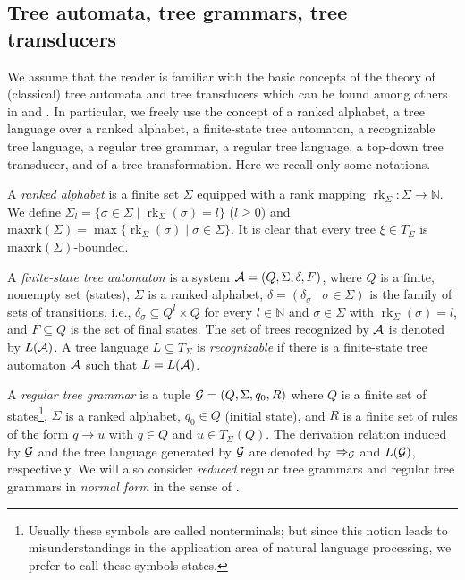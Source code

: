 \documentclass[10pt]{scrartcl}
\newcommand{\nat}{\mathbb{N}}
\newcommand{\maxrk}{{\mathrm{maxrk}}}
\newcommand{\A}{{\cal A}}
\newcommand{\G}{{\cal G}}
\DeclareMathOperator{\rk}{rk}
\begin{document}
\subsection{Tree automata, tree grammars, tree transducers}

We assume that the reader is familiar with the basic concepts of the theory of (classical) tree automata and tree transducers which can be found among others in \cite{gecste84,gecste97} and \cite{comdaugiljaclugtistom97}. In particular, we freely use the concept of a ranked alphabet, a tree language over a ranked alphabet, a finite-state tree automaton, a recognizable tree language, a regular tree grammar, a regular tree language, a top-down tree transducer, and of a tree transformation. Here we recall only some notations.

A {\em ranked alphabet} is a finite set $\Sigma$ equipped with a rank mapping $\rk_\Sigma: \Sigma \to \nat$. We define $\Sigma_l =\{ \sigma \in \Sigma \mid \rk_\Sigma(\sigma)=l \}$ ($l\ge 0$) and $\maxrk(\Sigma)=\max\{\rk_\Sigma(\sigma) \mid \sigma \in \Sigma \}$. 
It is clear that every tree $\xi \in T_\Sigma$ is $\maxrk(\Sigma)$-bounded.

A \emph{finite-state tree automaton} is a system $\A = (Q,\Sigma,\delta,F)$, where $Q$ is a finite, nonempty  set (states), $\Sigma$  is a ranked alphabet,  $\delta = (\delta_\sigma \mid \sigma \in \Sigma)$ is the family of sets of transitions, i.e., $\delta_\sigma \subseteq Q^l \times Q$ for every $l \in \nat$ and $\sigma \in \Sigma$ with $\rk_\Sigma(\sigma) =l$, and $F \subseteq Q$ is the set of final states. The set of trees recognized by $\A$ is denoted by $L(\A)$.
A tree language $L \subseteq T_\Sigma$ is {\em recognizable} if there is a finite-state tree automaton ${\cal A}$ such that $L = L({\cal A})$.


A \emph{regular tree grammar} is a tuple $\G = (Q,\Sigma,q_0,R)$ where $Q$ is a finite set of states\footnote{Usually these symbols are called nonterminals; but since this notion leads to misunderstandings in the application area of natural language processing, we prefer to call these symbols states.}, $\Sigma$ is a ranked alphabet, $q_0 \in Q$ (initial state), and  $R$ is a finite set of rules of the form $q \rightarrow u$ with $q \in Q$ and $u \in T_\Sigma(Q)$. The derivation relation induced by $\G$ and the tree language generated by $\G$ are denoted by $\Rightarrow_\G$ and $L(\G)$, respectively.
We will also consider {\em reduced} regular tree grammars and regular tree grammars in {\em normal form} in the sense of \cite{comdaugiljaclugtistom97}.
\end{document}
